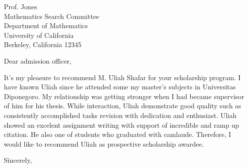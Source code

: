 \documentclass[12pt, a4paper]{simref} %
\begin{document}

\begin{letter}{
	Prof. Jones\\
	Mathematics Search Committee\\
	Department of Mathematics\\
	University of California\\
	Berkeley, California 12345
}


\opening{Dear admission officer,}

It's my pleasure to recommend M. Uliah Shafar for your scholarship program. I have known Uliah since he attended some my master's subjects in Universitas Diponegoro. My relationship was getting stronger when I had became supervisor of him for his thesis. While interaction, Uliah demonstrate good quality such as consistently accomplished tasks revision with dedication and enthusiast. Uliah showed an excelent  assignment writing with support of incredible and ramp up citation. He also one of students who graduated with camlaude. Therefore, I would like to recommend Uliah as prospective scholarship awardee.

\closing{Sincerely,}




\end{letter}
\end{document}
